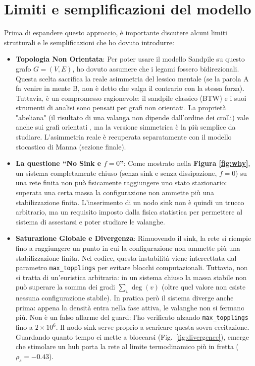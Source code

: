 \documentclass[10pt,a4paper]{article}
\begin{document}
\section{Limiti e semplificazioni del modello}
Prima di espandere questo approccio, è importante discutere alcuni limiti strutturali e le semplificazioni che ho dovuto introdurre:
\begin{itemize}
    \item \textbf{Topologia Non Orientata}: Per poter usare il modello Sandpile su questo grafo $G=(V,E)$, ho dovuto assumere che i legami fossero bidirezionali. Questa scelta sacrifica la reale asimmetria del lessico mentale (se la parola A fa venire in mente B, non è detto che valga il contrario con la stessa forza). Tuttavia, è un compromesso ragionevole: il sandpile classico (BTW) e i suoi strumenti di analisi sono pensati per grafi non orientati. La proprietà "abeliana" (il risultato di una valanga non dipende dall'ordine dei crolli) vale anche sui grafi orientati \cite{dhar1990}, ma la versione simmetrica è la più semplice da studiare. L'asimmetria reale è recuperata separatamente con il modello stocastico di Manna (sezione finale).
    \item \textbf{La questione ``No Sink e $f=0$''}: Come mostrato nella \textbf{Figura \ref{fig:why}}, un sistema completamente chiuso (senza sink e senza dissipazione, $f=0$) su una rete finita non può fisicamente raggiungere uno stato stazionario: superata una certa massa la configurazione non ammette più una stabilizzazione finita. L'inserimento di un nodo sink non è quindi un trucco arbitrario, ma un requisito imposto dalla fisica statistica per permettere al sistema di assestarsi e poter studiare le valanghe.
    \item \textbf{Saturazione Globale e Divergenza}: Rimuovendo il sink, la rete si riempie fino a raggiungere un punto in cui la configurazione non ammette più una stabilizzazione finita. Nel codice, questa instabilità viene intercettata dal parametro \texttt{max\_topplings} per evitare blocchi computazionali. Tuttavia, non si tratta di un'euristica arbitraria: in un sistema chiuso la massa stabile non può superare la somma dei gradi $\sum_{v} \deg(v)$ (oltre quel valore non esiste nessuna configurazione stabile). In pratica però il sistema diverge anche prima: appena la densità entra nella fase attiva, le valanghe non si fermano più. Non è un falso allarme del guard: l'ho verificato alzando \texttt{max\_topplings} fino a $2\times10^6$. Il nodo-sink serve proprio a scaricare questa sovra-eccitazione. Guardando quanto tempo ci mette a bloccarsi (Fig.~\ref{fig:divergence}), emerge che stimolare un hub porta la rete al limite termodinamico più in fretta ($\rho_s = -0.43$).

\end{itemize}
\end{document}
